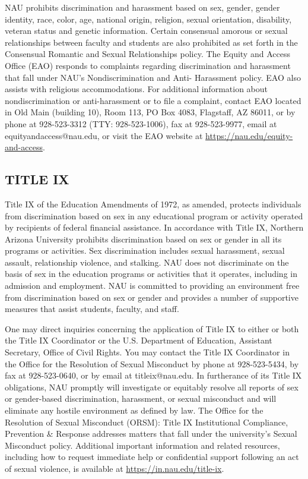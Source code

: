 \documentclass[
  letterpaper,
  DIV=11,
  numbers=noendperiod]{scrreprt}
\begin{document}
NAU prohibits discrimination and harassment based on sex, gender, gender
identity, race, color, age, national origin, religion, sexual
orientation, disability, veteran status and genetic information. Certain
consensual amorous or sexual relationships between faculty and students
are also prohibited as set forth in the Consensual Romantic and Sexual
Relationships policy. The Equity and Access Office (EAO) responds to
complaints regarding discrimination and harassment that fall under NAU's
Nondiscrimination and Anti- Harassment policy. EAO also assists with
religious accommodations. For additional information about
nondiscrimination or anti-harassment or to file a complaint, contact EAO
located in Old Main (building 10), Room 113, PO Box 4083, Flagstaff, AZ
86011, or by phone at 928-523-3312 (TTY: 928-523-1006), fax at
928-523-9977, email at equityandaccess@nau.edu, or visit the EAO website
at \url{https://nau.edu/equity-and-access}.

\hypertarget{title-ix}{%
\subsection{TITLE IX}\label{title-ix}}

Title IX of the Education Amendments of 1972, as amended, protects
individuals from discrimination based on sex in any educational program
or activity operated by recipients of federal financial assistance. In
accordance with Title IX, Northern Arizona University prohibits
discrimination based on sex or gender in all its programs or activities.
Sex discrimination includes sexual harassment, sexual assault,
relationship violence, and stalking. NAU does not discriminate on the
basis of sex in the education programs or activities that it operates,
including in admission and employment. NAU is committed to providing an
environment free from discrimination based on sex or gender and provides
a number of supportive measures that assist students, faculty, and
staff.

One may direct inquiries concerning the application of Title IX to
either or both the Title IX Coordinator or the U.S. Department of
Education, Assistant Secretary, Office of Civil Rights. You may contact
the Title IX Coordinator in the Office for the Resolution of Sexual
Misconduct by phone at 928-523-5434, by fax at 928-523-0640, or by email
at titleix@nau.edu. In furtherance of its Title IX obligations, NAU
promptly will investigate or equitably resolve all reports of sex or
gender-based discrimination, harassment, or sexual misconduct and will
eliminate any hostile environment as defined by law. The Office for the
Resolution of Sexual Misconduct (ORSM): Title IX Institutional
Compliance, Prevention \& Response addresses matters that fall under the
university's Sexual Misconduct policy. Additional important information
and related resources, including how to request immediate help or
confidential support following an act of sexual violence, is available
at \url{https://in.nau.edu/title-ix}.
\end{document}
